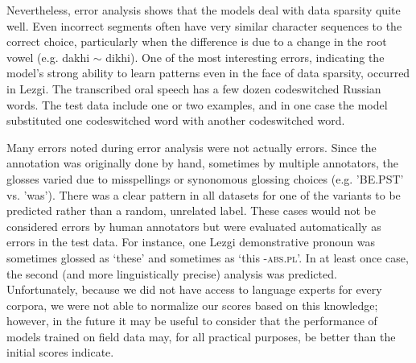 Nevertheless, error analysis shows that the models deal with data sparsity quite well. Even incorrect segments often have very similar character sequences to the correct choice, particularly when the difference is due to a change in the root vowel (e.g. dakhi $\sim$ dikhi). One of the most interesting errors, indicating the model's strong ability to learn patterns even in the face of data sparsity, occurred in Lezgi. The transcribed oral speech has a few dozen codeswitched Russian words. The test data include one or two examples, and in one case the model substituted one codeswitched word with another codeswitched word. 

Many errors noted during error analysis were not actually errors. Since the annotation was originally done by hand, sometimes by multiple annotators, the glosses varied due to misspellings or synonomous glossing choices (e.g. 'BE.PST' vs. 'was'). There was a clear pattern in all datasets for one of the variants to be predicted rather than a random, unrelated label. These cases would not be considered errors by human annotators but were evaluated automatically as errors in the test data. For instance, one Lezgi demonstrative pronoun was sometimes glossed as `these' and sometimes as `this \textsc{-abs.pl}'. In at least once case, the second (and more linguistically precise) analysis was predicted. Unfortunately, because we did not have access to language experts for every corpora, we were not able to normalize our scores based on this knowledge; however, in the future it may be useful to consider that the performance of models trained on field data may, for all practical purposes, be better than the initial scores indicate.

